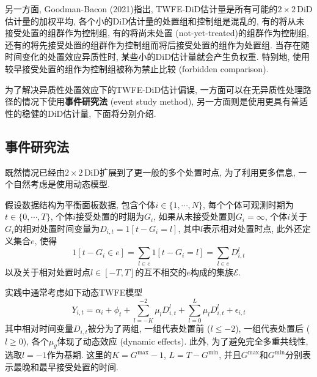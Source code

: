 \documentclass[cn,sakura,14pt,screen,bibstyle=gb7714-2015,math=mtpro2]{elegantnote}
\begin{document}
另一方面, Goodman-Bacon (2021)指出, TWFE-DiD估计量是所有可能的$2\times 2\,$DiD估计量的加权平均, 各个小的DiD估计量的处置组和控制组是混乱的, 有的将从未接受处置的组群作为控制组, 有的将尚未处置 (not-yet-treated)的组群作为控制组, 还有的将先接受处置的组群作为控制组而将后接受处置的组作为处置组. 当存在随时间变化的处置效应异质性时, 某些小的DiD估计量就会产生负权重. 特别地, 使用较早接受处置的组作为控制组被称为禁止比较 (forbidden comparison).

为了解决异质性处置效应下的TWFE-DiD估计偏误, 一方面可以在无异质性处理路径的情况下使用\textbf{事件研究法} (event study method), 另一方面则是使用更具有普适性的稳健的DiD估计量, 下面将分别介绍.
\subsection{事件研究法}
既然情况已经由$2\times 2\,$DiD扩展到了更一般的多个处置时点, 为了利用更多信息, 一个自然考虑是使用动态模型.

假设数据结构为平衡面板数据, 包含个体$i\in\{1,\cdots,N\}$, 每个个体可观测时期为$t\in\{0,\cdots,T\}$, 个体$i$接受处置的时期为$G_i$, 如果从未接受处置则$G_i=\infty$, 个体$i$关于$G_i$的相对处置时间变量为$D_{i,t}=1[t-G_i=l]$, 其中$l$表示相对处置时点, 此外还定义集合$e$, 使得
$$1[t-G_i\in e]=\sum_{l\in e}1[t-G_i=l]=\sum_{l\in e}D_{i,t}^l$$
以及关于相对处置时点$l\in [-T,T]$的互不相交的$e$构成的集族$\mathcal{E}$.

实践中通常考虑如下动态TWFE模型
$$Y_{i,t}=\alpha_i+\phi_t+\sum_{l=-K}^{-2}\mu_lD_{i,t}^l+\sum_{l=0}^{L}\mu_lD_{i,t}^l+\epsilon_{i,t}$$
其中相对时间变量$D_{i,t}$被分为了两组, 一组代表处置前 ($l\leq-2$), 一组代表处置后 ($l\ge0$), 各个$\mu_g$体现了动态效应 (dynamic effects). 此外, 为了避免完全多重共线性, 选取$l=-1$作为基期. 这里的$K=G^{\max}-1$, $L=T-G^{\min}$, 并且$G^{\max}$和$G^{\min}$分别表示最晚和最早接受处置的时间.
\end{document}
